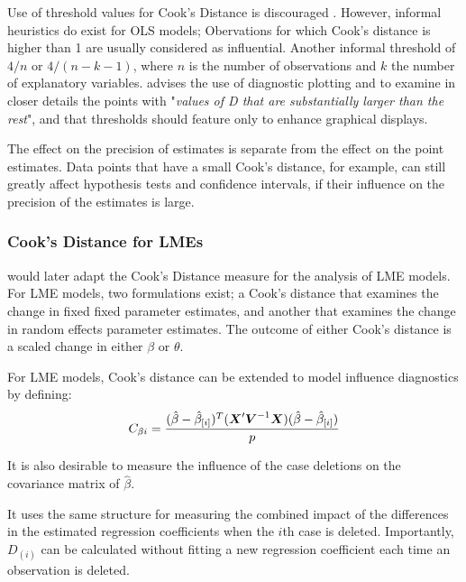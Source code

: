 \documentclass[12pt, a4paper]{report}
\theoremstyle{plain}
\theoremstyle{definition}
\theoremstyle{remark}
\begin{document}
	
	
	Use of threshold values for Cook's Distance is discouraged \citep{fox1997}. However, informal heuristics do exist for OLS models; Obervations for which Cook's distance is higher than 1 are usually considered as influential. Another informal threshold of $4/n$ or $4/(n-k-1)$, where $n$ is the number of observations and $k$ the number of explanatory variables.
	\citet{fox1997} advises the use of diagnostic plotting and to examine in closer details the points with "\textit{values of D that are substantially larger than the rest}", and that thresholds should feature only to enhance graphical displays.
	
	
	The effect on the precision of estimates is separate from the effect on the point estimates. Data points that have a small Cook's distance, for example, can still greatly affect hypothesis tests and confidence intervals, if their  influence on the precision of the estimates is large.


	
	\subsubsection{Cook's Distance for LMEs} %

	\citet{Christensen} would later adapt the Cook's Distance measure for the analysis of LME models. For LME models, two formulations exist; a Cook's distance that examines the change in fixed fixed parameter estimates, and another that examines the change in random effects parameter estimates. The outcome of either Cook's distance is a scaled change in either $\beta$ or $\theta$.
	
	For LME models, Cook's distance can be extended to model influence diagnostics by defining:
	\[ C_{\beta i} = {(\hat{\beta} - \hat{\beta}_{[i]})^{T}(\boldsymbol{X}^{\prime}\boldsymbol{V}^{-1}\boldsymbol{X}) (\hat{\beta} - \hat{\beta}_{[i]}) \over p}\]
	
	It is also desirable to measure the influence of the case deletions on the covariance matrix of $\hat{\beta}$.
	
	It uses the same structure for measuring the combined impact of the differences in the estimated regression coefficients when the $i$th case is deleted. Importantly, $D_{(i)}$ can be calculated without fitting a new regression coefficient each time an observation is deleted.
	
\end{document}
